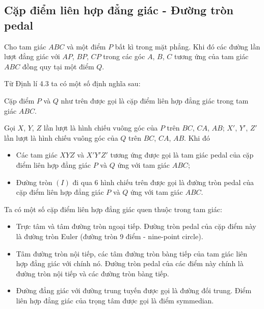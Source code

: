 \documentclass{article} %
\begin{document}
        \subsection{Cặp điểm liên hợp đẳng giác - Đường tròn pedal}
        
        \begin{theorem}
            Cho tam giác \(ABC\) và một điểm \(P\) bất kì trong mặt phẳng. Khi đó các đường lần lượt đẳng giác với \(AP\), \(BP\), \(CP\) trong các góc \(A\), \(B\), \(C\) tương ứng của tam giác \(ABC\) đồng quy tại một điểm \(Q\).
        \end{theorem}

        Từ Định lí 4.3 ta có một số định nghĩa sau:

        \begin{definition}
            Cặp điểm \(P\) và \(Q\) như trên được gọi là cặp điểm liên hợp đẳng giác trong tam giác \(ABC\).
        \end{definition}

        \begin{definition}
            Gọi \(X\), \(Y\), \(Z\) lần lượt là hình chiếu vuông góc của \(P\) trên \(BC\), \(CA\), \(AB\); \(X'\), \(Y'\), \(Z'\) lần lượt là hình chiếu vuông góc của \(Q\) trên \(BC\), \(CA\), \(AB\). Khi đó
            \begin{itemize}
                \item Các tam giác \(XYZ\) và \(X'Y'Z'\) tương ứng được gọi là tam giác pedal của cặp điểm liên hợp đẳng giác \(P\) và \(Q\) ứng với tam giác \(ABC\);
                \item Đường tròn \((I)\) đi qua 6 hình chiếu trên được gọi là đường tròn pedal của cặp điểm liên hợp đẳng giác $P$ và $Q$ ứng với tam giác \(ABC\).
            \end{itemize}
        \end{definition}

        Ta có một số cặp điểm liên hợp đẳng giác quen thuộc trong tam giác:
        \begin{itemize}
            \item Trực tâm và tâm đường tròn ngoại tiếp. Đường tròn pedal của cặp điểm này là đường tròn Euler (đường tròn 9 điểm - nine-point circle).
            \item Tâm đường tròn nội tiếp, các tâm đường tròn bàng tiếp của tam giác liên hợp đẳng giác với chính nó. Đường tròn pedal của các điểm này chính là đường tròn nội tiếp và các đường tròn bàng tiếp.
            \item Đường đẳng giác với đường trung tuyến được gọi là đường đối trung. Điểm liên hợp đẳng giác của trọng tâm được gọi là điểm symmedian.
        \end{itemize}
\end{document}
